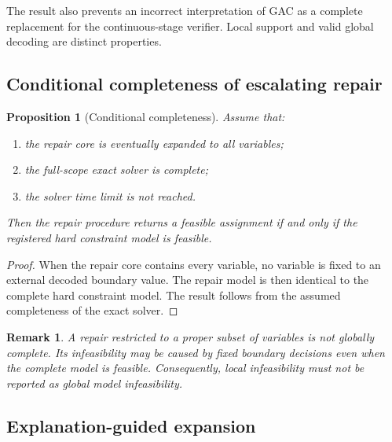 \documentclass[pdflatex,sn-mathphys-num,iicol,oneside]{sn-jnl}
\newtheorem{proposition}{Proposition}
\newtheorem{remark}{Remark}
\begin{document}
The result also prevents an incorrect interpretation of GAC as a
complete replacement for the continuous-stage verifier. Local support
and valid global decoding are distinct properties.

\subsection{Conditional completeness of escalating repair}

\begin{proposition}[Conditional completeness]
Assume that:

\begin{enumerate}
    \item the repair core is eventually expanded to all variables;
    \item the full-scope exact solver is complete;
    \item the solver time limit is not reached.
\end{enumerate}

Then the repair procedure returns a feasible assignment if and only if
the registered hard constraint model is feasible.
\end{proposition}

\begin{proof}
When the repair core contains every variable, no variable is fixed to
an external decoded boundary value. The repair model is then identical
to the complete hard constraint model. The result follows from the
assumed completeness of the exact solver.
\end{proof}

\begin{remark}
A repair restricted to a proper subset of variables is not globally
complete. Its infeasibility may be caused by fixed boundary decisions
even when the complete model is feasible. Consequently, local
infeasibility must not be reported as global model infeasibility.
\end{remark}

\subsection{Explanation-guided expansion}
\end{document}
